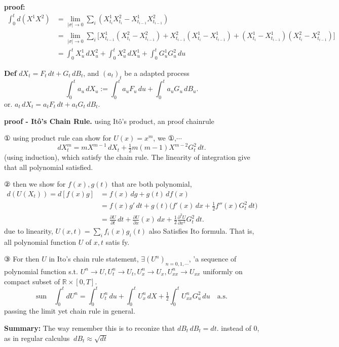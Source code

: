 \documentclass[
  letterpaper,
  DIV=11,
  numbers=noendperiod]{scrreprt}
\theoremstyle{definition}
\theoremstyle{plain}
\theoremstyle{plain}
\theoremstyle{definition}
\theoremstyle{plain}
\theoremstyle{plain}
\theoremstyle{remark}
\begin{document}
\textbf{proof:} \[
\begin{aligned}
\int_0^t d(X^1 X^2) &= \lim_{|\sigma| \to 0} \sum_i (X_{t_i}^1 X_{t_i}^2 - X_{t_{i-1}}^1 X_{t_{i-1}}^2) \\
&= \lim_{|\sigma| \to 0} \sum_i \big[X_{t_{i-1}}^1(X_{t_i}^2 - X_{t_{i-1}}^2) + X_{t_{i-1}}^2(X_{t_i}^1 - X_{t_{i-1}}^1) + (X_{t_i}^1 - X_{t_{i-1}}^1)(X_{t_i}^2 - X_{t_{i-1}}^2)\big] \\
&= \int_0^t X_u^1 \, dX_u^2 + \int_0^t X_u^2 \, dX_u^1 + \int_0^t G_u^1 G_u^2 \, du
\end{aligned}
\]

\textbf{Def} \(dX_t = F_t \, dt + G_t \, dB_t\), and \((a_t)_t\) be a
adapted process \[
\int_0^t a_u \, dX_u := \int_0^t a_u F_u \, du + \int_0^t a_u G_u \, dB_u.
\] or. \(a_t \, dX_t = a_t F_t \, dt + a_t G_t \, dB_t.\)

\textbf{proof - Itô's Chain Rule.} using Itô's product, an proof
chainrule

① using product rule can show for \(U(x) = x^m\), we ①,\(\cdots\) \[
dX_t^m = m X^{m-1} \, dX_t + \tfrac12 m(m-1) X^{m-2} G_t^2 \, dt.
\] (using induction), which satisfy the chain rule. The linearity of
integration give that all polynomial satisfied.

② then we show for \(f(x), g(t)\) that are both polynomial, \[
\begin{aligned}
d(U(X_t)) = d[f(x) g] &= f(x) \, dg + g(t) \, df(x) \\
&= f(x) g' \, dt + g(t)\big(f'(x) \, dx + \tfrac12 f''(x) G_t^2 \, dt\big) \\
&= \frac{\partial U}{\partial t} \, dt + \frac{\partial U}{\partial x}(x) \, dx + \tfrac12 \frac{\partial^2 U}{\partial x^2} G_t^2 \, dt.
\end{aligned}
\] due to linearity, \(U(x,t) = \sum_i f_i(x) g_i(t)\) also Satisfies
Ito formula. That is, all polynomial function \(U\) of \(x, t\) satis
fy.

③ For then \(U\) in Ito's chain rule statement,
\(\exists (U^n)_{n=0,1,\cdots}\), 'a sequence of polynomial function
s.t. \(U^n \to U, U_t^n \to U_t, U_x^n \to U_x, U_{xx}^n \to U_{xx}\)
uniformly on compact subset of \(\mathbb{R} \times [0,T]\). \[
\text{sun} \quad \int_0^t dU^n = \int_0^t U_t^n \, du + \int_0^t U_x^n \, dX + \tfrac12 \int_0^t U_{xx}^n G_u^2 \, du \quad \text{a.s.}
\] passing the limit yet chain rule in general.

\textbf{Summary:} The way remember this is to reconize that
\(dB_t \, dB_t = dt.\) instead of \(0\), as in regular calculus
\(\ dB_t \approx \sqrt{dt}\)
\end{document}
